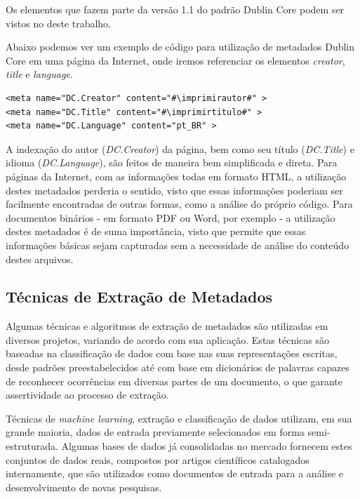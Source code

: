 Os elementos que fazem parte da versão 1.1 do padrão Dublin Core \cite{dublin-core-1-1} podem ser vistos no  deste trabalho.

Abaixo podemos ver um exemplo de código para utilização de metadados Dublin Core em uma página da Internet, onde iremos referenciar os elementos \textit{creator}, \textit{title} e \textit{language}.

\lstset{language=HTML}
\begin{lstlisting}[escapechar=\#]
<meta name="DC.Creator" content="#\imprimirautor#" >
<meta name="DC.Title" content="#\imprimirtitulo#" >
<meta name="DC.Language" content="pt_BR" >
\end{lstlisting}

A indexação do autor (\textit{DC.Creator}) da página, bem como seu título (\textit{DC.Title}) e idioma (\textit{DC.Language}), são feitos de maneira bem simplificada e direta. Para páginas da Internet, com as informações todas em formato HTML, a utilização destes metadados perderia o sentido, visto que essas informações poderiam ser facilmente encontradas de outras formas, como a análise do próprio código. Para documentos binários - em formato PDF ou Word, por exemplo - a utilização destes metadados é de suma importância, visto que permite que essas informações básicas sejam capturadas sem a necessidade de análise do conteúdo destes arquivos.

\subsection{Técnicas de Extração de Metadados}
\label{ssec:metadata-techniques}

Algumas técnicas e algoritmos de extração de metadados são utilizadas em diversos projetos, variando de acordo com sua aplicação. Estas técnicas são baseadas na classificação de dados com base nas suas representações escritas, desde padrões preestabelecidos até com base em dicionários de palavras capazes de reconhecer ocorrências em diversas partes de um documento, o que garante assertividade ao processo de extração.

Técnicas de \emph{machine learning}, extração e classificação de dados utilizam, em sua grande maioria, dados de entrada previamente selecionados em forma semi-estruturada. Algumas bases de dados já consolidadas no mercado fornecem estes conjuntos de dados reais, compostos por artigos científicos catalogados internamente, que são utilizados como documentos de entrada para a análise e desenvolvimento de novas pesquisas.

